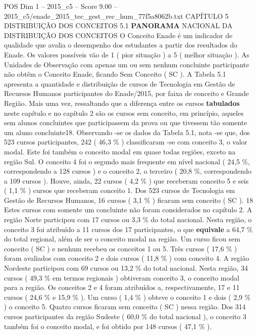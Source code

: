 \begin{textsample}{POS Dim 1 – 2015\_c5 – Score 9.00 – 2015\_c5/enade\_2015\_tec\_gest\_rec\_hum\_77f5a8062b.txt}  \label{ex:f1_pos_097}
CAPÍTULO 5 DISTRIBUIÇÃO DOS CONCEITOS 5.1 \textbf{PANORAMA} NACIONAL DA DISTRIBUIÇÃO DOS CONCEITOS O Conceito Enade é um indicador de qualidade que avalia o desempenho dos estudantes a partir dos resultados do Enade.
Os valores possíveis vão de 1 ( pior situação ) a 5 ( melhor situação ).
As Unidades de Observação com apenas um ou sem nenhum concluinte participante não obtêm o Conceito Enade, ficando Sem Conceito ( SC ).
A Tabela 5.1 apresenta a quantidade e distribuição de cursos de Tecnologia em Gestão de Recursos Humanos participantes do Enade/2015, por faixa de conceito e Grande Região.
Mais uma vez, ressaltando que a diferença entre os cursos \textbf{tabulados} neste capítulo e no capítulo 2 são os cursos sem conceito, em princípio, aqueles sem alunos concluintes que participassem da prova ou que tivessem tão somente um aluno concluinte18.
Observando -se os dados da Tabela 5.1, nota -se que, dos 523 cursos participantes, 242 ( 46,3 \% ) classificaram -se com conceito 3, o valor modal.
Este foi também o conceito modal em quase todas regiões, exceto na região Sul.
O conceito 4 foi o segundo mais frequente em nível nacional ( 24,5 \%, correspondendo a 128 cursos ) e o conceito 2, o terceiro ( 20,8 \%, correspondendo a 109 cursos ).
Houve, ainda, 22 cursos ( 4,2 \% ) que receberam conceito 5 e seis ( 1,1 \% ) cursos que receberam conceito 1.
Dos 523 cursos de Tecnologia em Gestão de Recursos Humanos, 16 cursos ( 3,1 \% ) ficaram sem conceito ( SC ). 18 Estes cursos com somente um concluinte não foram considerados no capítulo 2.
A região Norte participou com 17 cursos ou 3,3 \% do total nacional.
Nesta região, o conceito 3 foi atribuído a 11 cursos dos 17 participantes, o que \textbf{equivale} a 64,7 \% do total regional, além de ser o conceito modal na região.
Um curso ficou sem conceito ( SC ) e nenhum recebeu os conceitos 1 ou 5.
Três cursos ( 17,6 \% ) foram avaliados com conceito 2 e dois cursos ( 11,8 \% ) com conceito 4.
A região Nordeste participou com 69 cursos ou 13,2 \% do total nacional.
Nesta região, 34 cursos ( 49,3 \% em termos regionais ) obtiveram conceito 3, o conceito modal para a região.
Os conceitos 2 e 4 foram atribuídos a, respectivamente, 17 e 11 cursos ( 24,6 \% e 15,9 \% ).
Um curso ( 1,4 \% ) obteve o conceito 1 e dois ( 2,9 \% ) o conceito 5.
Quatro cursos ficaram sem conceito ( SC ) nessa região.
Dos 314 cursos participantes da região Sudeste ( 60,0 \% do total nacional ), o conceito 3 também foi o conceito modal, e foi obtido por 148 cursos ( 47,1 \% ).

\end{textsample}
